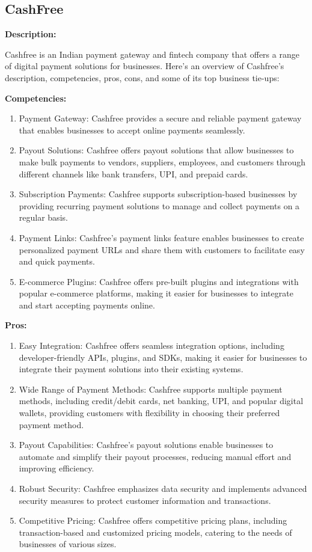 \subsection{CashFree}

\textbf{Description:}

Cashfree is an Indian payment gateway and fintech company that offers a range of digital payment solutions for businesses. Here's an overview of Cashfree's description, competencies, pros, cons, and some of its top business tie-ups:

\textbf{Competencies:}

\begin{enumerate}
\item Payment Gateway: Cashfree provides a secure and reliable payment gateway that enables businesses to accept online payments seamlessly.
\item Payout Solutions: Cashfree offers payout solutions that allow businesses to make bulk payments to vendors, suppliers, employees, and customers through different channels like bank transfers, UPI, and prepaid cards.
\item Subscription Payments: Cashfree supports subscription-based businesses by providing recurring payment solutions to manage and collect payments on a regular basis.
\item Payment Links: Cashfree's payment links feature enables businesses to create personalized payment URLs and share them with customers to facilitate easy and quick payments.
\item E-commerce Plugins: Cashfree offers pre-built plugins and integrations with popular e-commerce platforms, making it easier for businesses to integrate and start accepting payments online.
\end{enumerate}

\textbf{Pros:}

\begin{enumerate}
\item Easy Integration: Cashfree offers seamless integration options, including developer-friendly APIs, plugins, and SDKs, making it easier for businesses to integrate their payment solutions into their existing systems.
\item Wide Range of Payment Methods: Cashfree supports multiple payment methods, including credit/debit cards, net banking, UPI, and popular digital wallets, providing customers with flexibility in choosing their preferred payment method.
\item Payout Capabilities: Cashfree's payout solutions enable businesses to automate and simplify their payout processes, reducing manual effort and improving efficiency.
\item Robust Security: Cashfree emphasizes data security and implements advanced security measures to protect customer information and transactions.
\item Competitive Pricing: Cashfree offers competitive pricing plans, including transaction-based and customized pricing models, catering to the needs of businesses of various sizes.
\end{enumerate}

